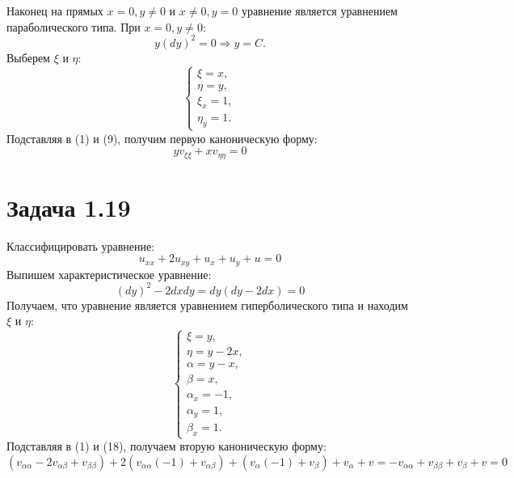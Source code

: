 \documentclass[11pt]{article}
\begin{document}
Наконец на прямых $x = 0, y \neq 0$ и $x \neq 0, y = 0$ уравнение является уравнением параболического типа.
При $x = 0, y \neq 0$:
\begin{equation}
y(dy)^2 = 0 \Rightarrow y = C.
\end{equation}
Выберем $\xi$ и $\eta$:
\begin{equation}
\begin{cases}
\xi = x, \\
\eta = y, \\
\xi_x = 1, \\
\eta_y = 1.
\end{cases}
\end{equation}
Подставляя в (1) и (9), получим первую каноническую форму:
\begin{equation}
yv_{\xi\xi} + xv_{\eta\eta} = 0
\end{equation}

\section{Задача 1.19}
\label{sec:orgc1689f4}
Классифицировать уравнение:
\begin{equation}
u_{xx} + 2u_{xy} + u_{x} + u_{y} + u = 0
\end{equation}
Выпишем характеристическое уравнение:
\begin{equation}
(dy)^2 - 2dxdy = dy(dy - 2dx) = 0
\end{equation}
Получаем, что уравнение является уравнением гиперболического типа и находим $\xi$ и $\eta$:
\begin{equation}
\begin{cases}
\xi = y, \\
\eta = y - 2x, \\
\alpha = y - x, \\
\beta = x, \\
\alpha_x = -1, \\
\alpha_y = 1, \\
\beta_x = 1.
\end{cases}
\end{equation}
Подставляя в (1) и (18), получаем вторую каноническую форму:
\begin{equation}
(v_{\alpha\alpha} - 2v_{\alpha\beta} + v_{\beta\beta}) + 2(v_{\alpha\alpha}(-1) + v_{\alpha\beta}) +
(v_{\alpha}(-1) + v_{\beta}) + v_{\alpha} + v = -v_{\alpha\alpha} + v_{\beta\beta} + v_{\beta} + v = 0
\end{equation}
\end{document}
